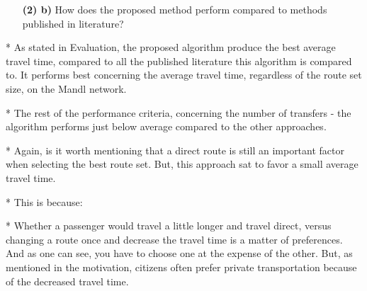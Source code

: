 

    


\begin{itemize}
\item[\textbf{(2) b)}] How does the proposed method perform compared to methods published in literature?
\end{itemize}
* As stated in Evaluation, the proposed algorithm produce the best average travel time, compared to all the published literature this algorithm is compared to. It performs best concerning the average travel time, regardless of the route set size, on the Mandl network. 

* The rest of the performance criteria, concerning the number of transfers - the algorithm performs just below average compared to the other approaches. 

* Again, is it worth mentioning that a direct route is still an important factor when selecting the best route set. But, this approach sat to favor a small average travel time.

* This is because:

* Whether a passenger would travel a little longer and travel direct, versus changing a route once and decrease the travel time is a matter of preferences. And as one can see, you have to choose one at the expense of the other. But, as mentioned in the motivation, citizens often prefer private transportation because of the decreased travel time. 
